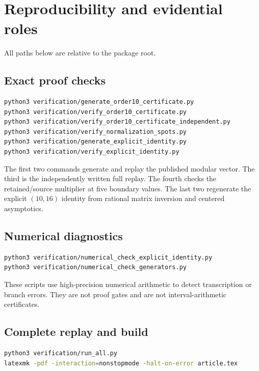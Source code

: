 \section{Reproducibility and evidential roles}
\label{app:reproducibility}

All paths below are relative to the package root.

\subsection{Exact proof checks}

\begin{lstlisting}[language=bash]
python3 verification/generate_order10_certificate.py
python3 verification/verify_order10_certificate.py
python3 verification/verify_order10_certificate_independent.py
python3 verification/verify_normalization_spots.py
python3 verification/generate_explicit_identity.py
python3 verification/verify_explicit_identity.py
\end{lstlisting}

The first two commands generate and replay the published modular vector.
The third is the independently written full replay.  The fourth checks
the retained/source multiplier at five boundary values.  The last two
regenerate the explicit $(10,16)$ identity from rational matrix
inversion and centered asymptotics.

\subsection{Numerical diagnostics}

\begin{lstlisting}[language=bash]
python3 verification/numerical_check_explicit_identity.py
python3 verification/numerical_check_generators.py
\end{lstlisting}

These scripts use high-precision numerical arithmetic to detect
transcription or branch errors.  They are not proof gates and are not
interval-arithmetic certificates.

\subsection{Complete replay and build}

\begin{lstlisting}[language=bash]
python3 verification/run_all.py
latexmk -pdf -interaction=nonstopmode -halt-on-error article.tex
\end{lstlisting}

